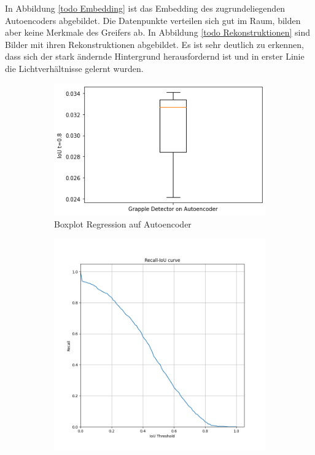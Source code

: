 	In Abbildung \ref{todo Embedding} ist das Embedding des zugrundeliegenden Autoencoders abgebildet. Die Datenpunkte verteilen sich gut im Raum, bilden aber keine Merkmale des Greifers ab. In Abbildung \ref{todo Rekonstruktionen} sind Bilder mit ihren Rekonstruktionen abgebildet. Es ist sehr deutlich zu erkennen, dass sich der stark ändernde Hintergrund herausfordernd ist und in erster Linie die Lichtverhältnisse gelernt wurden.   
	
	
	   \begin{figure}[h]
		\centering
		\begin{subfigure}[c]{0.49\textwidth}			
			\includegraphics[width=1\textwidth,center]{bilder/Hauptteil/Autoencoder_Grappel_Detection/IoU_AE_Grapple.png}
			\caption[Boxplot]{Boxplot Regression auf Autoencoder}
			\label{img:BoxPlot_RegressionAufAutoencoder}	
		\end{subfigure}
		\begin{subfigure}[c]{0.49\textwidth}			
			\includegraphics[width=1\textwidth, center]{bilder/Hauptteil/Autoencoder_Grappel_Detection/IoU.png}

\end{subfigure}
\end{figure}
